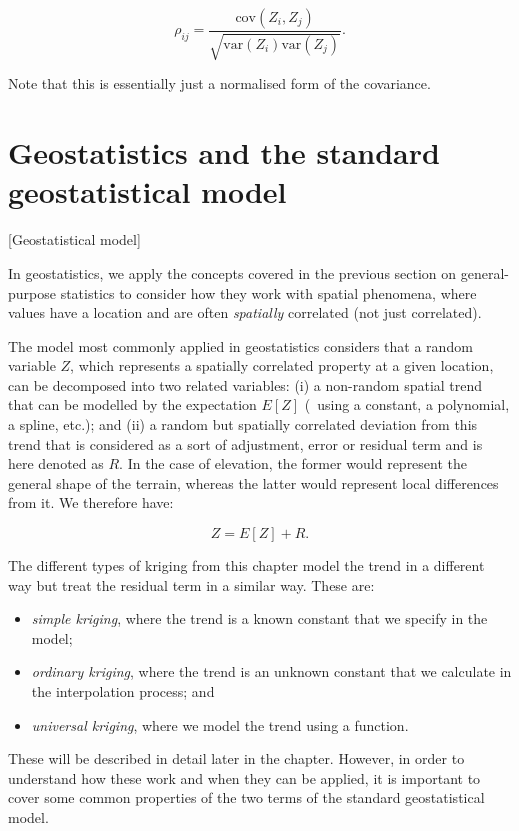 \begin{equation}
\rho_{ij}=\frac{\mathrm{cov}(Z_i, Z_j)}{\sqrt{\mathrm{var}(Z_i) \mathrm{var}(Z_j)}}. \nonumber
\end{equation}

Note that this is essentially just a normalised form of the covariance.

\section{Geostatistics and the standard geostatistical model}[Geostatistical model]

In geostatistics, we apply the concepts covered in the previous section on general-purpose statistics to consider how they work with spatial phenomena, where values have a location and are often \emph{spatially} correlated (not just correlated).

The model most commonly applied in geostatistics considers that a random variable \(Z\), which represents a spatially correlated property at a given location, can be decomposed into two related variables: (i) a non-random spatial trend that can be modelled by the expectation \(E[Z]\) (\eg\ using a constant, a polynomial, a spline, etc.); and (ii) a random but spatially correlated deviation from this trend that is considered as a sort of adjustment, error or residual term and is here denoted as \(R\).
In the case of elevation, the former would represent the general shape of the terrain, whereas the latter would represent local differences from it.
We therefore have:

\begin{equation}
\label{eq:geostat}
Z = E\left[Z\right] + R.
\end{equation}

The different types of kriging from this chapter model the trend in a different way but treat the residual term in a similar way.
These are:
\begin{itemize}
\item \emph{simple kriging}, where the trend is a known constant that we specify in the model;
\item \emph{ordinary kriging}, where the trend is an unknown constant that we calculate in the interpolation process; and
\item \emph{universal kriging}, where we model the trend using a function.
\end{itemize}

These will be described in detail later in the chapter.
However, in order to understand how these work and when they can be applied, it is important to cover some common properties of the two terms of the standard geostatistical model.

